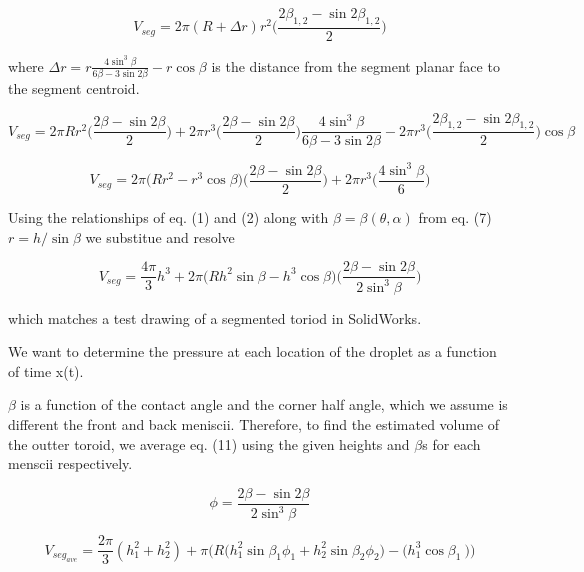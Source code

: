 \documentclass{article}
\begin{document}
\begin{equation} 
V_{seg} = 2\pi(R+\Delta r)r^2 \Big( \frac{2\beta_{1,2} - \sin2 \beta_{1,2}}{2} \Big) 
\end{equation}

where $\Delta r = r \frac{4\sin^3\beta}{6\beta - 3\sin2\beta} - r\cos\beta$ is the distance from the segment planar face to the segment centroid. 

\begin{equation}V_{seg} = 2\pi R r^2 \Big( \frac{2\beta - \sin2 \beta}{2} \Big) + 2\pi r^3 \Big( \frac{2\beta - \sin2 \beta}{2} \Big)\frac{4\sin^3\beta}{6\beta - 3\sin2\beta} - 2\pi r^3 \Big( \frac{2\beta_{1,2} - \sin2 \beta_{1,2}}{2} \Big)\cos\beta
\end{equation}

\begin{equation}
V_{seg} = 2\pi \Big(Rr^2 - r^3\cos\beta\Big)  \Big( \frac{2\beta - \sin2 \beta}{2} \Big) + 2\pi r^3 \Big( \frac{4\sin^3\beta}{6} \Big)
\end{equation}


Using the relationships of eq. (1) and (2) along with $\beta = \beta(\theta,\alpha)$ from eq. (7) $r = h/\sin\beta$ we substitue and resolve

\begin{equation}
V_{seg} = \frac{4\pi}{3} h^3 + 2\pi \Big(Rh^2\sin\beta - h^3\cos\beta\Big)  \Big( \frac{2\beta - \sin2 \beta}{2\sin^3\beta} \Big)
\end{equation}

which matches a test drawing of a segmented toriod in SolidWorks.

We want to determine the pressure at each location of the droplet as a function of time x(t). 



$\beta$ is a function of the contact angle and the corner half angle, which we assume is different the front and back meniscii. Therefore, to find the estimated volume of the outter toroid, we average eq. (11) using the given heights and $\beta$s for each menscii respectively.

$$\phi= \frac{2\beta - \sin2 \beta}{2\sin^3\beta}$$

\begin{equation}
V_{seg_{ave}} = \frac{2\pi}{3}(h_1^2 + h_2^2) + \pi\Big(R\big(h_1^2\sin\beta_1 \phi_1+h_2^2\sin\beta_2 \phi_2\big) - \big(h_1^3\cos\beta_1\ \big)\Big)
\end{equation} 

\pagebreak
\end{document}
